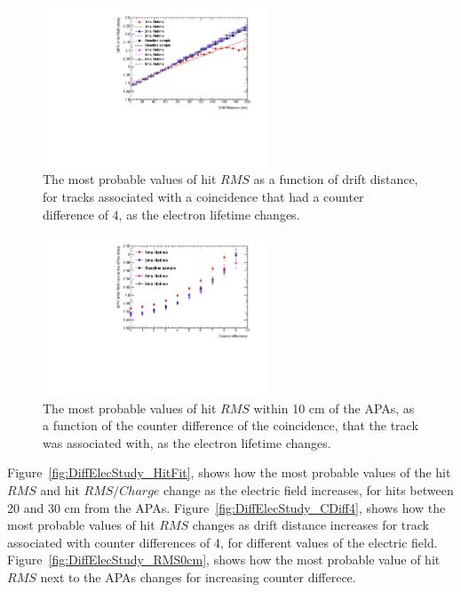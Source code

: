 \begin{figure}[h!]
  \centering
  \includegraphics[width=0.6\textwidth]{Canvas_CountDiff4_All_Positions_ElecLifetime}
  \caption[The drift distance dependence of diffusion in the 35 ton dataset and Monte Carlo for coincidences with a counter difference of 4, as the electron lifetime changes]
          {The most probable values of hit $RMS$ as a function of drift distance, for tracks associated with a coincidence that had a counter difference of 4, as the electron lifetime changes.}
  \label{fig:DiffLifeStudy_CDiff4}
\end{figure}

\begin{figure}[h!]
  \centering
  \includegraphics[width=0.6\textwidth]{Canvas_All_Angles_RMS0cm_ElecLifetime}
  \caption[The angular dependence of diffusion in the 35 ton dataset and Monte Carlo for hits within 10 cm of the APAs, as the electron lifetime changes]
          {The most probable values of hit $RMS$ within 10 cm of the APAs, as a function of the counter difference of the coincidence, that the track was associated with, as the electron lifetime changes.}
  \label{fig:DiffLifeStudy_RMS0cm}
\end{figure}

Figure~\ref{fig:DiffElecStudy_HitFit}, shows how the most probable values of the hit $RMS$ and hit $RMS/Charge$ change as the electric field increases, for hits between 20 and 30 cm from the APAs. Figure~\ref{fig:DiffElecStudy_CDiff4}, shows how the most probable values of hit $RMS$ changes as drift distance increases for track associated with counter differences of 4, for different values of the electric field. Figure~\ref{fig:DiffElecStudy_RMS0cm}, shows how the most probable value of hit $RMS$ next to the APAs changes for increasing counter differece. \\

